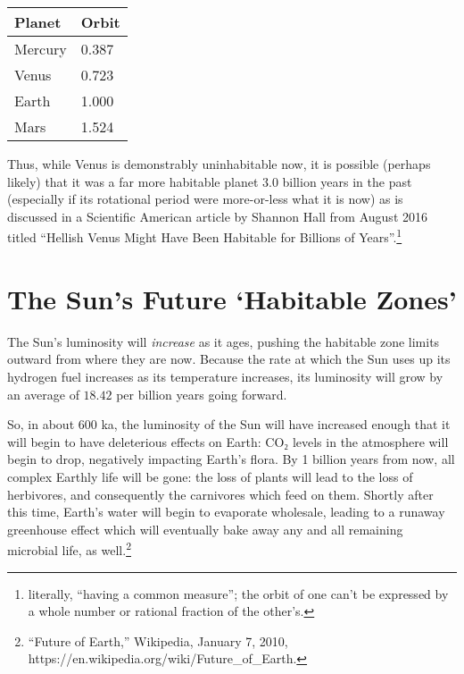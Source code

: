 \documentclass[
  letterpaper,
]{book}
\begin{document}
\begin{longtable}[]{@{}ll@{}}
\toprule\noalign{}
Planet & Orbit \\
\midrule\noalign{}
\endhead
\bottomrule\noalign{}
\endlastfoot
Mercury & 0.387 \\
Venus & 0.723 \\
Earth & 1.000 \\
Mars & 1.524 \\
\end{longtable}

Thus, while Venus is demonstrably uninhabitable now, it is possible
(perhaps likely) that it was a far more habitable planet 3.0 billion
years in the past (especially if its rotational period were more-or-less
what it is now) as is discussed in a Scientific American article by
Shannon Hall from August 2016 titled ``Hellish Venus Might Have Been
Habitable for Billions of Years''.\footnote{literally, ``having a common
  measure''; the orbit of one can't be expressed by a whole number or
  rational fraction of the other's.}

\section{The Sun's Future `Habitable
Zones'}\label{the-suns-future-habitable-zones}

The Sun's luminosity will \emph{increase} as it ages, pushing the
habitable zone limits outward from where they are now. Because the rate
at which the Sun uses up its hydrogen fuel increases as its temperature
increases, its luminosity will grow by an average of \(18.42\) per
billion years going forward.

So, in about \(600\) ka, the luminosity of the Sun will have increased
enough that it will begin to have deleterious effects on Earth: CO₂
levels in the atmosphere will begin to drop, negatively impacting
Earth's flora. By 1 billion years from now, all complex Earthly life
will be gone: the loss of plants will lead to the loss of herbivores,
and consequently the carnivores which feed on them. Shortly after this
time, Earth's water will begin to evaporate wholesale, leading to a
runaway greenhouse effect which will eventually bake away any and all
remaining microbial life, as well.\footnote{``Future of Earth,''
  Wikipedia, January 7, 2010,
  https://en.wikipedia.org/wiki/Future\_of\_Earth.}
\end{document}
